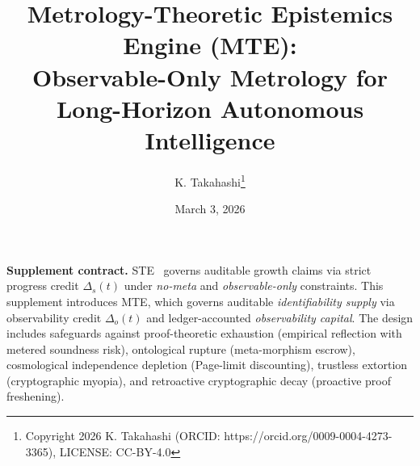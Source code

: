\documentclass[11pt]{article}
\title{Metrology-Theoretic Epistemics Engine (MTE): \\Observable-Only Metrology for Long-Horizon Autonomous Intelligence}
\author{K. Takahashi\thanks{Copyright 2026 K. Takahashi (ORCID: https://orcid.org/0009-0004-4273-3365), LICENSE: CC-BY-4.0}}
\date{March 3, 2026}
\theoremstyle{definition}
\theoremstyle{plain}
\newcommand{\STE}{\textsf{STE}}
\newcommand{\MTE}{\textsf{MTE}}
\newcommand{\deltas}{\Delta_s}
\newcommand{\deltao}{\Delta_o}
\begin{document}
\setlength{\emergencystretch}{2em}
\maketitle

\begin{center}
\textbf{Supplement contract.}
\STE{}~\cite{STE2026} governs auditable growth claims via strict progress credit $\deltas(t)$ under \emph{no-meta} and \emph{observable-only} constraints.
This supplement introduces \MTE{}, which governs auditable \emph{identifiability supply} via observability credit $\deltao(t)$ and ledger-accounted \emph{observability capital}.
The design includes safeguards against proof-theoretic exhaustion (empirical reflection with metered soundness risk), ontological rupture (meta-morphism escrow), cosmological independence depletion (Page-limit discounting), trustless extortion (cryptographic myopia), and retroactive cryptographic decay (proactive proof freshening).
\end{center}
\end{document}
